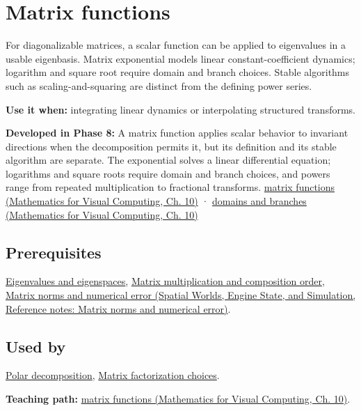 \hypertarget{appendix-0f4bc2bf2b1f}{}\label{referencestart:appendix-0f4bc2bf2b1f}
\section{Matrix functions}\label{appendix-0f4bc2bf2b1f-matrix-functions}

For diagonalizable matrices, a scalar function can be applied to eigenvalues in a usable eigenbasis. Matrix exponential models linear constant-coefficient dynamics; logarithm and square root require domain and branch choices. Stable algorithms such as scaling-and-squaring are distinct from the defining power series.

\textbf{Use it when:} integrating linear dynamics or interpolating structured transforms.

\textbf{Developed in Phase 8:} A matrix function applies scalar behavior to invariant directions when the decomposition permits it, but its definition and its stable algorithm are separate. The exponential solves a linear differential equation; logarithms and square roots require domain and branch choices, and powers range from repeated multiplication to fractional transforms. \href{../02-Mathematics-for-Visual-Computing/main.pdf\#nameddest=02-foundations-ii-ch026-matrix-functions-turn-repeated-linear-actions-into-one-operator}{matrix functions (Mathematics for Visual Computing, Ch. 10)} · \href{../02-Mathematics-for-Visual-Computing/main.pdf\#nameddest=02-foundations-ii-ch026-logarithms-and-square-roots-need-domains-and-branches}{domains and branches (Mathematics for Visual Computing, Ch. 10)}

\subsection{Prerequisites}\label{appendix-0f4bc2bf2b1f-prerequisites}

\hyperref[appendix-0b3be18411f9]{Eigenvalues and eigenspaces}, \hyperref[appendix-ab31ef447dbf]{Matrix multiplication and composition order}, \href{../05-Spatial-Worlds-Engine-State-and-Simulation/main.pdf\#nameddest=appendix-f8657bac66e5}{Matrix norms and numerical error (Spatial Worlds, Engine State, and Simulation, Reference notes: Matrix norms and numerical error)}.

\subsection{Used by}\label{appendix-0f4bc2bf2b1f-used-by}

\hyperref[appendix-73f5bcf7a462]{Polar decomposition}, \hyperref[appendix-221a483bec2d]{Matrix factorization choices}.

\textbf{Teaching path:} \href{../02-Mathematics-for-Visual-Computing/main.pdf\#nameddest=02-foundations-ii-ch026-matrix-functions-turn-repeated-linear-actions-into-one-operator}{matrix functions (Mathematics for Visual Computing, Ch. 10)}.
